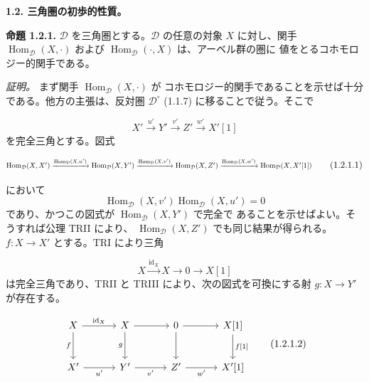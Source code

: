 \clearpage
{}%
\begingroup
\small
\setlength{\abovedisplayskip}{4pt plus 2pt minus 2pt}%
\setlength{\belowdisplayskip}{4pt plus 2pt minus 2pt}%

\medskip
\noindent\textbf{1.2. 三角圏の初歩的性質。}

\medskip
\noindent\textbf{命題 1.2.1.}\quad
$\mathcal D$ を三角圏とする。$\mathcal D$ の任意の対象 $X$ に対し、関手
$\operatorname{Hom}_{\mathcal D}(X,\mathord\cdot)$ および
$\operatorname{Hom}_{\mathcal D}(\mathord\cdot,X)$ は、アーベル群の圏に
値をとるコホモロジー的関手である。

\noindent\emph{証明。}\quad
まず関手 $\operatorname{Hom}_{\mathcal D}(X,\mathord\cdot)$ が
コホモロジー的関手であることを示せば十分である。他方の主張は、反対圏
$\mathcal D^\circ$ (1.1.7) に移ることで従う。そこで

\[
  X'\xrightarrow{u'}Y'\xrightarrow{v'}Z'\xrightarrow{w'}X'[1]
\]
を完全三角とする。図式

\begin{equation}
  \resizebox{0.98\linewidth}{!}{$
    \operatorname{Hom}_{\mathcal D}(X,X')
    \xrightarrow{\operatorname{Hom}_{\mathcal D}(X,u')}
    \operatorname{Hom}_{\mathcal D}(X,Y')
    \xrightarrow{\operatorname{Hom}_{\mathcal D}(X,v')}
    \operatorname{Hom}_{\mathcal D}(X,Z')
    \xrightarrow{\operatorname{Hom}_{\mathcal D}(X,w')}
    \operatorname{Hom}_{\mathcal D}(X,X'[1])
  $}
  \tag{1.2.1.1}
\end{equation}

において
\[
  \operatorname{Hom}_{\mathcal D}(X,v')
  \operatorname{Hom}_{\mathcal D}(X,u')=0
\]
であり、かつこの図式が $\operatorname{Hom}_{\mathcal D}(X,Y')$ で完全で
あることを示せばよい。そうすれば公理 TRII により、
$\operatorname{Hom}_{\mathcal D}(X,Z')$ でも同じ結果が得られる。
$f\colon X\longrightarrow X'$ とする。TRI により三角

\[
  X\xrightarrow{\operatorname{id}_X}X\longrightarrow0\longrightarrow X[1]
\]
は完全三角であり、TRII と TRIII により、次の図式を可換にする射
$g\colon X\longrightarrow Y'$ が存在する。

\begin{equation}
  \begin{tikzcd}[column sep=3.2em,row sep=2.5em]
    X \arrow[r,"{\operatorname{id}_X}"] \arrow[d,"f"']
      & X \arrow[r] \arrow[d,"g"']
      & 0 \arrow[r] \arrow[d]
      & X[1] \arrow[d,"{f[1]}"] \\
    X' \arrow[r,"u'"']
      & Y' \arrow[r,"v'"']
      & Z' \arrow[r,"w'"']
      & X'[1]
  \end{tikzcd}
  \tag{1.2.1.2}
\end{equation}

